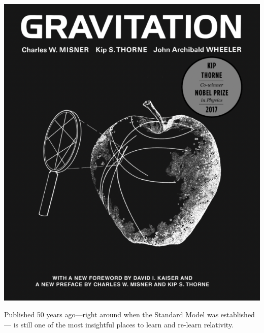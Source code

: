 \documentclass[12pt, oneside]{report}    %
\begin{document}
\begin{marginfigure}%
    \includegraphics[width=.8\textwidth]{figures/MSW_cover.png}
    \caption{Published 50 years ago---right around when the Standard Model was established--- is still one of the most insightful places to learn and re-learn relativity. }
    \label{fig:MTW:cover}
\end{marginfigure}
\end{document}
